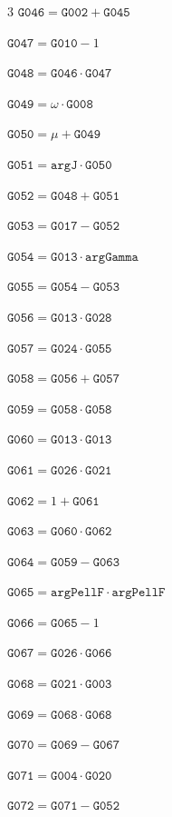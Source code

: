 \documentclass[10pt]{article}
\begin{document}
\begin{multicols}{3}
\noindent $\mathtt{G046}=\mathtt{G002}+\mathtt{G045}$\par
\noindent $\mathtt{G047}=\mathtt{G010}-1$\par
\noindent $\mathtt{G048}=\mathtt{G046}\cdot \mathtt{G047}$\par
\noindent $\mathtt{G049}=\omega\cdot \mathtt{G008}$\par
\noindent $\mathtt{G050}=\mu+\mathtt{G049}$\par
\noindent $\mathtt{G051}=\mathtt{argJ}\cdot \mathtt{G050}$\par
\noindent $\mathtt{G052}=\mathtt{G048}+\mathtt{G051}$\par
\noindent $\mathtt{G053}=\mathtt{G017}-\mathtt{G052}$\par
\noindent $\mathtt{G054}=\mathtt{G013}\cdot \mathtt{argGamma}$\par
\noindent $\mathtt{G055}=\mathtt{G054}-\mathtt{G053}$\par
\noindent $\mathtt{G056}=\mathtt{G013}\cdot \mathtt{G028}$\par
\noindent $\mathtt{G057}=\mathtt{G024}\cdot \mathtt{G055}$\par
\noindent $\mathtt{G058}=\mathtt{G056}+\mathtt{G057}$\par
\noindent $\mathtt{G059}=\mathtt{G058}\cdot \mathtt{G058}$\par
\noindent $\mathtt{G060}=\mathtt{G013}\cdot \mathtt{G013}$\par
\noindent $\mathtt{G061}=\mathtt{G026}\cdot \mathtt{G021}$\par
\noindent $\mathtt{G062}=1+\mathtt{G061}$\par
\noindent $\mathtt{G063}=\mathtt{G060}\cdot \mathtt{G062}$\par
\noindent $\mathtt{G064}=\mathtt{G059}-\mathtt{G063}$\par
\noindent $\mathtt{G065}=\mathtt{argPellF}\cdot \mathtt{argPellF}$\par
\noindent $\mathtt{G066}=\mathtt{G065}-1$\par
\noindent $\mathtt{G067}=\mathtt{G026}\cdot \mathtt{G066}$\par
\noindent $\mathtt{G068}=\mathtt{G021}\cdot \mathtt{G003}$\par
\noindent $\mathtt{G069}=\mathtt{G068}\cdot \mathtt{G068}$\par
\noindent $\mathtt{G070}=\mathtt{G069}-\mathtt{G067}$\par
\noindent $\mathtt{G071}=\mathtt{G004}\cdot \mathtt{G020}$\par
\noindent $\mathtt{G072}=\mathtt{G071}-\mathtt{G052}$\par

\end{multicols}
\end{document}
